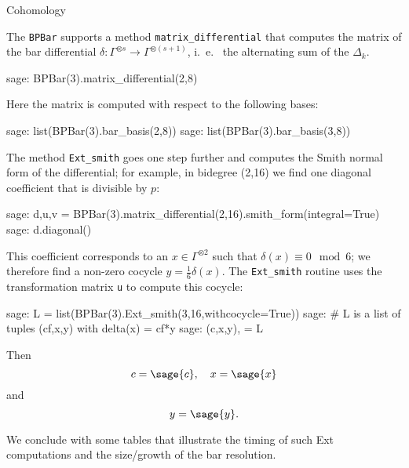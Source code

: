 \documentclass[a4paper]{paper}
\newcommand{\stt}[1]{{\tt#1}}
\begin{document}
\begin{section}{Cohomology}

    The \stt{BPBar} supports a method \stt{matrix\_differential} that computes the matrix
    of the bar differential $\delta:\Gamma^{\otimes s}\rightarrow\Gamma^{\otimes (s+1)}$,
    i.~e.~ the alternating sum of the $\Delta_k$.
    \begin{sageexample}
        sage: BPBar(3).matrix_differential(2,8)
    \end{sageexample}
    Here the matrix is computed with respect to the following bases:
    \begin{sageexample}
        sage: list(BPBar(3).bar_basis(2,8))
        sage: list(BPBar(3).bar_basis(3,8))
    \end{sageexample}
    The method \stt{Ext\_smith} goes one step further and computes the Smith normal form
    of the differential; for example, in bidegree (2,16) we find one diagonal coefficient that
    is divisible by $p$:
    \begin{sagecommandline}
    sage: d,u,v = BPBar(3).matrix_differential(2,16).smith_form(integral=True)
    sage: d.diagonal()
    \end{sagecommandline}
    This coefficient corresponds to an $x\in \Gamma^{\otimes 2}$ such that $\delta(x)\equiv 0\mod 6$;
    we therefore find a non-zero cocycle $y=\frac16\delta(x)$. The \stt{Ext\_smith} routine
    uses the transformation matrix \stt{u} to compute this cocycle:
    \begin{sagecommandline}
    sage: L = list(BPBar(3).Ext_smith(3,16,withcocycle=True))
    sage: # L is a list of tuples (cf,x,y) with delta(x) = cf*y
    sage: (c,x,y), = L
    \end{sagecommandline}
    Then
    $$c=\sage{c},\quad x=\sage{x}$$
    and
    $$y=\sage{y}.$$

    We conclude with some tables that illustrate the timing of such Ext computations and the
    size/growth of the bar resolution.

\end{section}
\end{document}
